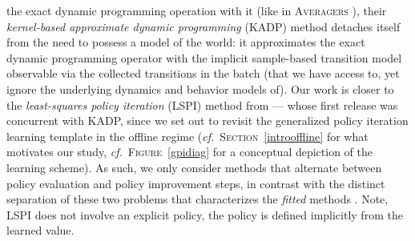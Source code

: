 the exact dynamic programming operation with it (like
in \textsc{Averagers} \cite{Gordon1995-er}),
their \textit{kernel-based approximate dynamic programming} (KADP) method
detaches itself from the need to possess a model of the world:
it approximates the exact dynamic programming operator
with the implicit sample-based transition model observable via the
collected transitions in the batch
(that we have access to, yet ignore the underlying dynamics and behavior models of).
Our work is closer to the \textit{least-squares policy iteration} (LSPI) method
from \cite{Lagoudakis2003-gp}
--- whose first release was concurrent with KADP,
since we set out to revisit the generalized policy iteration learning template in the offline regime
(\textit{cf.}~\textsc{Section}~\ref{introoffline} for what motivates our study,
\textit{cf.}~\textsc{Figure}~\ref{gpidiag} for a conceptual depiction of the learning scheme).
As such, we only consider methods that alternate between policy evaluation and
policy improvement steps, in contrast with the distinct separation of these two problems that characterizes the
\textit{fitted} methods \cite{Gordon1995-er, Ernst2005-sf, Riedmiller2005-ok,
Antos2007-bw, Neumann2008-tm, Lange2010-mq, Hafner2011-rv}.
Note, LSPI \cite{Lagoudakis2003-gp}
does not involve an explicit policy, the policy is defined implicitly from the learned value.


